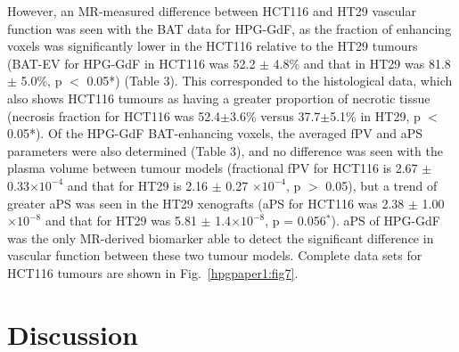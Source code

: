 However, an MR-measured difference between HCT116 and HT29 vascular function was seen with the \acs{BAT} data for \acs{HPG-GdF}, as the fraction of enhancing voxels was significantly lower in the HCT116 relative to the HT29 tumours (BAT-EV for \acs{HPG-GdF} in HCT116 was 52.2 $\pm$ 4.8\% and that in HT29 was 81.8 $\pm$ 5.0\%, p $<$ 0.05*) (Table 3).
This corresponded to the histological data, which also shows HCT116 tumours as having a greater proportion of necrotic tissue (necrosis fraction for HCT116 was 52.4$\pm$3.6\% versus 37.7$\pm$5.1\% in HT29, p $<$ 0.05*).
Of the \acs{HPG-GdF} \acs{BAT}-enhancing voxels, the averaged \acs{fPV} and \acs{aPS} parameters were also determined (Table 3), and no difference was seen with the plasma volume between tumour models (fractional \acs{fPV} for HCT116 is 2.67 $\pm$ 0.33$\times10^{-4}$ and that for HT29 is 2.16 $\pm$ 0.27 $\times10^{-4}$, p $>$ 0.05), but a trend of greater \acs{aPS} was seen in the HT29 xenografts (aPS for HCT116 was 2.38 $\pm$ 1.00$\times10^{-8}$ and that for HT29 was 5.81 $\pm$ 1.4$\times10^{-8}$, p = 0.056$^*$).
\acs{aPS} of \acs{HPG-GdF} was the only MR-derived biomarker able to detect the significant difference in vascular function between these two tumour models.
Complete data sets for HCT116 tumours are shown in Fig.~\ref{hpgpaper1:fig7}.

\section{Discussion}

